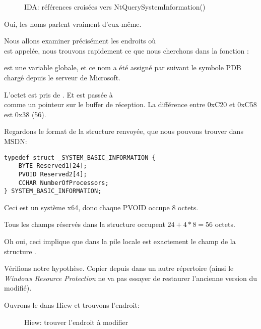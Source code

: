 \begin{figure}[H]
\centering
{}
\caption{IDA: références croisées vers NtQuerySystemInformation()}
\end{figure}

Oui, les noms parlent vraiment d'eux-même.

Nous allons examiner précisément les endroits où\\
 est appelée,
nous trouvons rapidement ce que nous cherchons dans la fonction :



 est une variable globale, et ce nom a été assigné par \IDA suivant
le symbole \gls{PDB} chargé depuis le serveur de Microsoft.

L'octet est pris de .
Et  est passée à\\
 comme un pointeur sur le buffer de réception.
La différence entre 0xC20 et 0xC58 est 0x38 (56).

Regardons le format de la structure renvoyée, que nous pouvons trouver dans MSDN:

\begin{lstlisting}[style=customc]
typedef struct _SYSTEM_BASIC_INFORMATION {
    BYTE Reserved1[24];
    PVOID Reserved2[4];
    CCHAR NumberOfProcessors;
} SYSTEM_BASIC_INFORMATION;
\end{lstlisting}

Ceci est un système x64, donc chaque PVOID occupe 8 octets.

Tous les champs réservés dans la structure occupent $24+4*8=56$ octets.

Oh oui, ceci implique que  dans la pile locale est exactement le champ
 de la structure .

Vérifions notre hypothèse.
Copier  depuis 
dans un autre répertoire (ainsi le \emph{Windows Resource Protection} ne va pas essayer
de restaurer l'ancienne version du  modifié).

Ouvrons-le dans Hiew et trouvons l'endroit:

\begin{figure}[H]
\centering
{}
\caption{Hiew: trouver l'endroit à modifier}
\end{figure}


